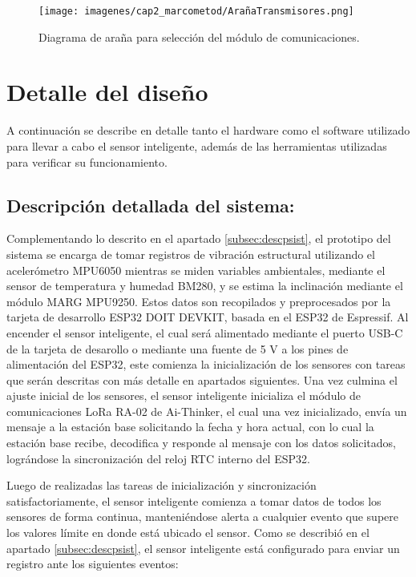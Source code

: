 \begin{figure}[H]
    \centering
    \texttt{[image: imagenes/cap2\_marcometod/ArañaTransmisores.png]}
    \caption{Diagrama de araña para selección del módulo de comunicaciones.}
    \label{fig:arañacomm}
\end{figure}


\section{Detalle del diseño} A continuación se describe en detalle tanto el hardware como el software utilizado para llevar a cabo el sensor inteligente, además de las herramientas utilizadas para verificar su funcionamiento.


\subsection{Descripción detallada del sistema:}
\label{subsec:descripcion}

Complementando lo descrito en el apartado \ref{subsec:descpsist}, el prototipo del sistema se encarga de tomar registros de vibración estructural utilizando el acelerómetro MPU6050 mientras se miden variables ambientales, mediante el sensor de temperatura y humedad BM280, y se estima la inclinación mediante el módulo MARG MPU9250. Estos datos son recopilados y preprocesados por la tarjeta de desarrollo ESP32 DOIT DEVKIT, basada en el ESP32 de Espressif. Al encender el sensor inteligente, el cual será alimentado mediante el puerto USB-C de la tarjeta de desarollo o mediante una fuente de 5 V a los pines de alimentación del ESP32, este comienza la inicialización de los sensores con tareas que serán descritas con más detalle en apartados siguientes. Una vez culmina el ajuste inicial de los sensores, el sensor inteligente inicializa el módulo de comunicaciones LoRa RA-02 de Ai-Thinker, el cual una vez inicializado, envía un mensaje a la estación base solicitando la fecha y hora actual, con lo cual la estación base recibe, decodifica y responde al mensaje con los datos solicitados, lográndose la sincronización del reloj RTC interno del ESP32.

Luego de realizadas las tareas de inicialización y sincronización satisfactoriamente, el sensor inteligente comienza a tomar datos de todos los sensores de forma continua, manteniéndose alerta a cualquier evento que supere los valores límite en donde está ubicado el sensor. Como se describió en el apartado \ref{subsec:descpsist}, el sensor inteligente está configurado para enviar un registro ante los siguientes eventos:

